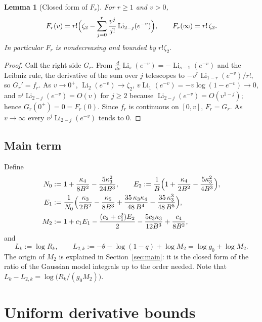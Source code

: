\documentclass[11pt]{amsart}
\newtheorem{lemma}[theorem]{Lemma}
\theoremstyle{definition}
\theoremstyle{remark}
\numberwithin{equation}{section}
\newcommand{\Li}{\operatorname{Li}}
\begin{document}
\begin{lemma}[Closed form of $F_r$]\label{lem:Fr}
For $r\ge1$ and $v>0$,
\[
  F_r(v)=r!\Bigl(\zeta_2-\sum_{j=0}^{r}\frac{v^j}{j!}\Li_{2-j}(e^{-v})\Bigr),\qquad F_r(\infty)=r!\,\zeta_2 .
\]
In particular $F_r$ is nondecreasing and bounded by $r!\zeta_2$.
\end{lemma}

\begin{proof}
Call the right side $G_r$. From $\frac{d}{dv}\Li_s(e^{-v})=-\Li_{s-1}(e^{-v})$ and the Leibniz rule, the derivative of the sum over $j$
telescopes to $-v^r\Li_{1-r}(e^{-v})/r!$, so $G_r'=f_r$. As $v\to0^+$, $\Li_2(e^{-v})\to\zeta_2$, $v\Li_1(e^{-v})=-v\log(1-e^{-v})\to0$,
and $v^j\Li_{2-j}(e^{-v})=O(v)$ for $j\ge2$ because $\Li_{2-j}(e^{-v})=O(v^{1-j})$; hence $G_r(0^+)=0=F_r(0)$. Since $f_r$ is continuous
on $[0,v]$, $F_r=G_r$. As $v\to\infty$ every $v^j\Li_{2-j}(e^{-v})$ tends to $0$.
\end{proof}

\subsection{Main term}
Define
\begin{equation}\label{eq:M2}
\begin{aligned}
  N_0&:=1+\frac{\kappa_4}{8B^2}-\frac{5\kappa_3^2}{24B^3},\qquad
  E_2:=\frac1B\Bigl(1+\frac{\kappa_4}{2B^2}-\frac{5\kappa_3^2}{4B^3}\Bigr),\\
  E_1&:=\frac1{N_0}\Bigl(\frac{\kappa_3}{2B^2}-\frac{\kappa_5}{8B^3}+\frac{35\,\kappa_3\kappa_4}{48\,B^4}-\frac{35\,\kappa_3^3}{48\,B^5}\Bigr),\\
  M_2&:=1+c_1E_1-\frac{(c_2+c_1^2)E_2}{2}-\frac{5c_3\kappa_3}{12B^3}+\frac{c_4}{8B^2},
\end{aligned}
\end{equation}
and
\begin{equation}\label{eq:L2}
  L_k:=\log R_k,\qquad L_{2,k}:=-\theta-\log(1-q)+\log M_2 = \log g_0+\log M_2 .
\end{equation}
The origin of $M_2$ is explained in Section~\ref{sec:main}: it is the closed form of the ratio of the Gaussian model integrals
up to the order needed. Note that $L_k-L_{2,k}=\log\bigl(R_k/(g_0M_2)\bigr)$.

\section{Uniform derivative bounds}\label{sec:deriv}
\end{document}
